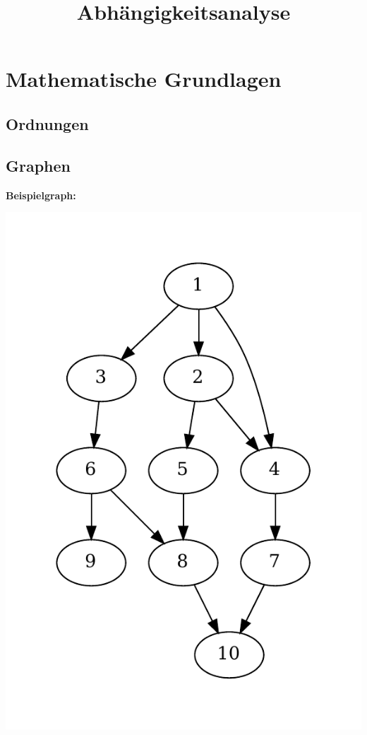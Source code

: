 \documentclass[a4paper,10pt]{scrartcl}
\title{Abhängigkeitsanalyse}
\begin{document}
\maketitle

\tableofcontents
\newpage

\section{Mathematische Grundlagen}
\subsection{Ordnungen}
\subsection{Graphen}

\textbf{Beispielgraph:}

\begin{center}
\includegraphics[scale=0.7]{BeispielgraphGraphentheorie.pdf}
\end{center}
\end{document}
